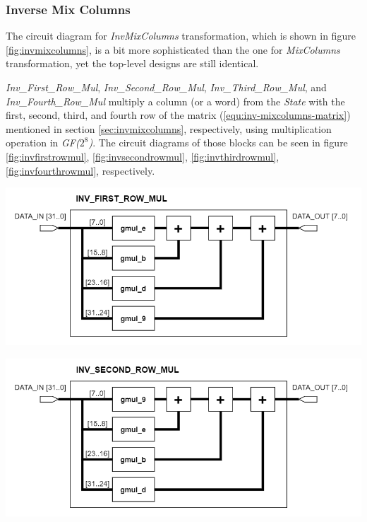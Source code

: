 \documentclass[a4paper, 10pt]{article}
\newenvironment{Figure}
    {\par\medskip\noindent\minipage{\linewidth}}
    {\endminipage\par\medskip}
\begin{document}
\begin{multicols}{2}
            \subsubsection{Inverse Mix Columns}

            The circuit diagram for \textit{InvMixColumns} transformation, which is shown in figure \ref{fig:invmixcolumns}, is a bit more sophisticated than the one for \textit{MixColumns} transformation, yet the top-level designs are still identical.

	\textit{Inv\_First\_Row\_Mul}, \textit{Inv\_Second\_Row\_Mul}, \textit{Inv\_Third\_Row\_Mul}, and \textit{Inv\_Fourth\_Row\_Mul} multiply a column (or a word) from the \textit{State} with the first, second, third, and fourth row of the matrix (\ref{equ:inv-mixcolumns-matrix}) mentioned in section \ref{sec:invmixcolumns}, respectively, using multiplication operation in \textit{GF($2^{8}$)}. The circuit diagrams of those blocks can be seen in figure \ref{fig:invfirstrowmul}, \ref{fig:invsecondrowmul}, \ref{fig:invthirdrowmul}, \ref{fig:invfourthrowmul}, respectively.

	\noindent
            \begin{Figure}
                \centering
                \includegraphics[width=\linewidth]{InvMixColumns-Inv_First_Row_Mul.png}
                \label{fig:invfirstrowmul}
            \end{Figure}

	\noindent
            \begin{Figure}
                \centering
                \includegraphics[width=\linewidth]{InvMixColumns-Inv_Second_Row_Mul.png}
                \label{fig:invsecondrowmul}
            \end{Figure}


\end{multicols}
\end{document}
